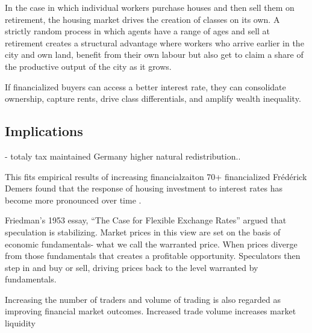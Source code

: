 In the case in which individual workers purchase houses and then sell them on retirement, the housing market drives the creation of classes on its own. A strictly random process in which agents have a range of ages and sell at retirement creates a structural advantage where workers who arrive earlier in the city and own land, benefit from their own labour but also get to claim a share of the productive output of the city as it grows. %

If financialized buyers can access a better interest rate, they can consolidate ownership, capture rents, drive class differentials, and amplify wealth inequality. %


\subsection{Implications}
- totaly tax maintained
Germany higher natural redistribution..

This fits empirical results of increasing financialzaiton 70+ financialized
Fr\'ed\'erick Demers found that the response of housing investment to interest rates has become more pronounced over time \cite{demersModellingForecastingHousing2005}. %



Friedman's 1953 essay, ``The Case for Flexible Exchange Rates'' \cite{friedmanEssaysPositiveEconomics1953} argued that speculation is stabilizing. Market prices in this view  are set on the basis of economic fundamentals- what we call the warranted price. When prices diverge from those fundamentals that creates a profitable opportunity. Speculators then step in and buy or sell, driving prices back to the level warranted by fundamentals.

Increasing the number of traders and volume of trading is also regarded as improving financial market outcomes. Increased trade volume increases market liquidity 



